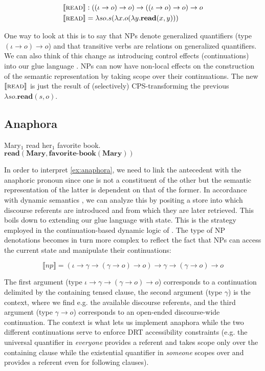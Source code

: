 \documentclass{article}
\newcommand{\sem}[1]{\llbracket #1 \rrbracket}
\begin{document}
\begin{align*}
  \sem{\textsc{read}} & : ((\iota \to o) \to o) \to ((\iota \to o) \to o) \to
  o \\
  \sem{\textsc{read}} & = \lambda s o. s (\lambda x. o (\lambda
  y. \textbf{read}(x, y)))
\end{align*}

One way to look at this is to say that NPs denote generalized quantifiers
(type $(\iota \to o) \to o$) and that transitive verbs are relations on
generalized quantifiers. We can also think of this change as introducing
control effects (continuations) into our glue language
\citep{barker2002continuations}. NPs can now have non-local effects on the
construction of the semantic representation by taking scope over their
continuations. The new $\sem{\textsc{read}}$ is just the result of
(selectively) CPS-transforming the previous $\lambda s o. \textbf{read}(s,
o)$.

\subsection{Anaphora}
\label{ssec:anaphora}

\begin{exe}
  \ex \label{ex:anaphora} Mary$_1$ read her$_1$ favorite book. \\
  $\textbf{read}(\textbf{Mary}, \textbf{favorite-book}(\textbf{Mary}))$
\end{exe}

In order to interpret \eqref{ex:anaphora}, we need to link the antecedent with
the anaphoric pronoun since one is not a constituent of the other but the
semantic representation of the latter is dependent on that of the former. In
accordance with dynamic semantics \citep{kamp1993discourse}, we can analyze
this by positing a store into which discourse referents are introduced and
from which they are later retrieved. This boils down to extending our glue
language with state. This is the strategy employed in the continuation-based
dynamic logic of \citet{de2006towards}. The type of NP denotations becomes in
turn more complex to reflect the fact that NPs can access the current state
and manipulate their continuations:

$$
\sem{np} = (\iota \to \gamma \to (\gamma \to o) \to o) \to \gamma \to (\gamma
\to o) \to o
$$

The first argument (type $\iota \to \gamma \to (\gamma \to o) \to o$) corresponds
to a continuation delimited by the containing tensed clause, the second
argument (type $\gamma$) is the context, where we find e.g. the available
discourse referents, and the third argument (type $\gamma \to o$) corresponds
to an open-ended discourse-wide continuation. The context is what lets us
implement anaphora while the two different continuations serve to enforce DRT
accessibility constraints \citep{kamp1993discourse} (e.g. the universal
quantifier in \emph{everyone} provides a referent and takes scope only over
the containing clause while the existential quantifier in \emph{someone}
scopes over and provides a referent even for following clauses).
\end{document}
